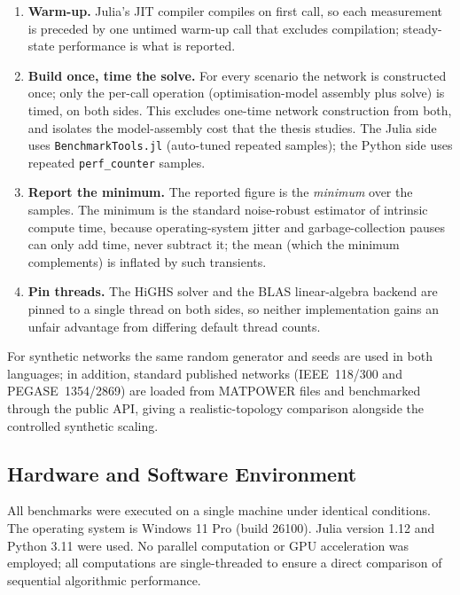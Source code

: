 \begin{enumerate}
    \item \textbf{Warm-up.} Julia's JIT compiler compiles on first call, so each measurement is preceded by one untimed warm-up call that excludes compilation; steady-state performance is what is reported.
    \item \textbf{Build once, time the solve.} For every scenario the network is constructed once; only the per-call operation (optimisation-model assembly plus solve) is timed, on both sides. This excludes one-time network construction from both, and isolates the model-assembly cost that the thesis studies. The Julia side uses \texttt{BenchmarkTools.jl} (auto-tuned repeated samples); the Python side uses repeated \texttt{perf\_counter} samples.
    \item \textbf{Report the minimum.} The reported figure is the \emph{minimum} over the samples. The minimum is the standard noise-robust estimator of intrinsic compute time, because operating-system jitter and garbage-collection pauses can only add time, never subtract it; the mean (which the minimum complements) is inflated by such transients.
    \item \textbf{Pin threads.} The HiGHS solver and the BLAS linear-algebra backend are pinned to a single thread on both sides, so neither implementation gains an unfair advantage from differing default thread counts.
\end{enumerate}

For synthetic networks the same random generator and seeds are used in both languages; in addition, standard published networks (IEEE~118/300 and PEGASE~1354/2869) are loaded from MATPOWER files and benchmarked through the public API, giving a realistic-topology comparison alongside the controlled synthetic scaling.

\subsection{Hardware and Software Environment}

All benchmarks were executed on a single machine under identical conditions. The operating system is Windows 11 Pro (build 26100). Julia version 1.12 and Python 3.11 were used. No parallel computation or GPU acceleration was employed; all computations are single-threaded to ensure a direct comparison of sequential algorithmic performance.

